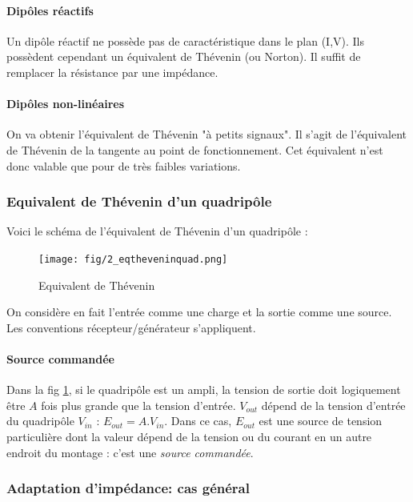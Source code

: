 \documentclass[a4paper]{article}
\begin{document}
    \paragraph{Dipôles réactifs} Un dipôle réactif ne possède pas de caractéristique
    dans le plan (I,V). Ils possèdent cependant un équivalent de Thévenin (ou Norton).
    Il suffit de remplacer la résistance par une impédance.

    \paragraph{Dipôles non-linéaires} On va obtenir l'équivalent de Thévenin "à petits signaux".
    Il s'agit de l'équivalent de Thévenin de la tangente au point de fonctionnement.
    Cet équivalent n'est donc valable que pour de très faibles variations.

    \subsubsection{Equivalent de Thévenin d'un quadripôle}
    Voici le schéma de l'équivalent de Thévenin d'un quadripôle :
    \begin{figure}[H]
        \begin{center}
            \texttt{[image: fig/2\_eqtheveninquad.png]}
            \caption{Equivalent de Thévenin}
            \label{fig:2_eqtheveninquad}
        \end{center}
    \end{figure}
    On considère en fait l'entrée comme une charge et la sortie comme une source.
    Les conventions récepteur/générateur s'appliquent.

    \paragraph{Source commandée} Dans la fig \ref{fig:2_eqtheveninquad}, si le 
    quadripôle est un ampli, la tension de sortie doit logiquement être $A$ fois
    plus grande que la tension d'entrée. $V_{out}$ dépend de la tension d'entrée
    du quadripôle $V_{in}$ : $E_{out} = A . V_{in}$. Dans ce cas, $E_{out}$ est une 
    source de tension particulière dont la valeur dépend de la tension ou du courant
    en un autre endroit du montage : c'est une \textit{source commandée}.

    \subsubsection{Adaptation d'impédance: cas général}
\end{document}
